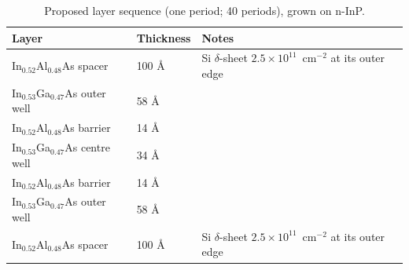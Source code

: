 \documentclass[11pt]{article}
\begin{document}
\begin{table}[t]
\centering\small
\caption{Proposed layer sequence (one period; 40 periods), grown on n-InP.}\label{tab:design}
\begin{tabular}{@{}lll@{}}
\toprule
Layer & Thickness & Notes \\ \midrule
In$_{0.52}$Al$_{0.48}$As spacer & 100 \AA & Si $\delta$-sheet $2.5\times10^{11}$~cm$^{-2}$ at its outer edge \\
In$_{0.53}$Ga$_{0.47}$As outer well & 58 \AA & \\
In$_{0.52}$Al$_{0.48}$As barrier & 14 \AA & \\
In$_{0.53}$Ga$_{0.47}$As centre well & 34 \AA & \\
In$_{0.52}$Al$_{0.48}$As barrier & 14 \AA & \\
In$_{0.53}$Ga$_{0.47}$As outer well & 58 \AA & \\
In$_{0.52}$Al$_{0.48}$As spacer & 100 \AA & Si $\delta$-sheet $2.5\times10^{11}$~cm$^{-2}$ at its outer edge \\ \bottomrule
\end{tabular}
\end{table}
\end{document}
